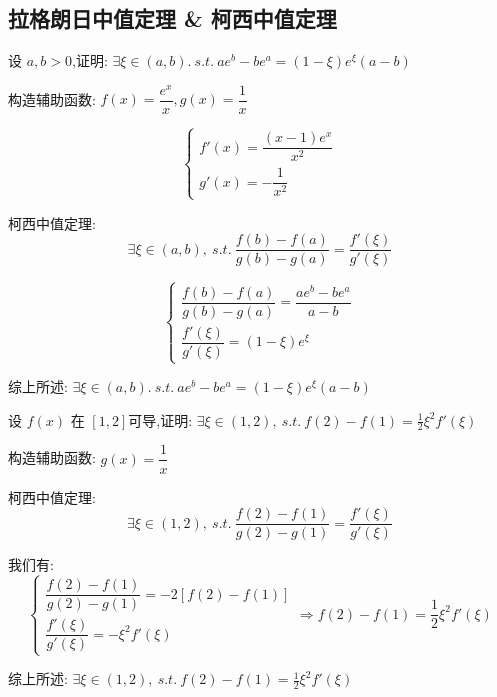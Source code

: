 \subsection{拉格朗日中值定理 \& 柯西中值定理}

\begin{proposition}
	设 $a,b>0$,证明: $\exists \xi\in(a,b).\ s.t.\ ae^b-be^a=(1-\xi)e^{\xi}(a-b)$
\end{proposition}
\begin{solution}

	构造辅助函数: $f(x)=\dfrac{e^{x}}{x},g(x)=\dfrac{1}{x}$

	$$\begin{cases}
		f'(x) = \dfrac{(x-1)e^{x}}{x^{2}}\\
		g'(x) = -\dfrac{1}{x^{2}}
	\end{cases}$$

	柯西中值定理:
	$$\exists \xi\in(a,b),\ s.t.\ \dfrac{f(b)-f(a)}{g(b)-g(a)}=\dfrac{f'(\xi)}{g'(\xi)}$$


	$$\begin{cases}
		\dfrac{f(b)-f(a)}{g(b)-g(a)}=\dfrac{ae^b-be^a}{a-b} \\
		\dfrac{f'(\xi)}{g'(\xi)}=(1-\xi)e^{\xi}
	\end{cases}$$

	综上所述: $\exists \xi\in(a,b).\ s.t.\ ae^b-be^a=(1-\xi)e^{\xi}(a-b)$
\end{solution}

\begin{proposition}
	设 $f(x)$ 在 $[1,2]$可导,证明: $\exists \xi\in(1,2),\ s.t.\ f(2)-f(1)=\frac{1}{2}\xi^2f'(\xi)$
\end{proposition}
\begin{solution}

	构造辅助函数: $g(x)=\dfrac{1}{x}$

	柯西中值定理:
	$$\exists\xi\in(1,2),\ s.t.\ \dfrac{f(2)-f(1)}{g(2)-g(1)}=\dfrac{f'(\xi)}{g'(\xi)}$$

	我们有:
	$$\begin{cases}
		\dfrac{f(2)-f(1)}{g(2)-g(1)}=-2[f(2)-f(1)] \\
		\dfrac{f'(\xi)}{g'(\xi)}=-\xi^2f'(\xi)
	\end{cases}\Rightarrow f(2)-f(1)=\frac{1}{2}\xi^2f'(\xi)$$

	综上所述: $\exists \xi\in(1,2),\ s.t.\ f(2)-f(1)=\frac{1}{2}\xi^2f'(\xi)$
\end{solution}

